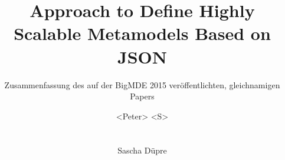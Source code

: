 \documentclass[ngerman]{ewks-latex}
\begin{document}
\title{Approach to Define Highly Scalable Metamodels Based on JSON}

\subtitle{Zusammenfassung des auf der BigMDE 2015 veröffentlichten, gleichnamigen Papers}

\author{
	\alignauthor
	<Peter> <S>\\
	\\
    \\
	\alignauthor
	Sascha D\"upre\\
	\\
    \\
}

\maketitle












\end{document}
